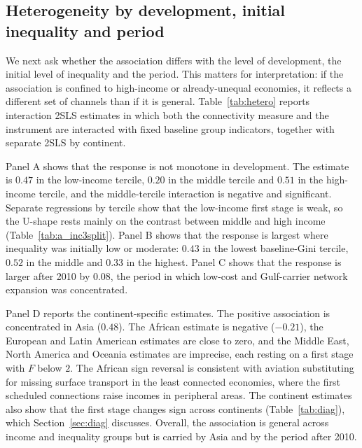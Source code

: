 \subsection{Heterogeneity by development, initial inequality and period}
\label{sec:hetero}
We next ask whether the association differs with the level of development, the initial level of inequality and the period. This matters for interpretation: if the association is confined to high-income or already-unequal economies, it reflects a different set of channels than if it is general. Table~\ref{tab:hetero} reports interaction 2SLS estimates in which both the connectivity measure and the instrument are interacted with fixed baseline group indicators, together with separate 2SLS by continent.

Panel A shows that the response is not monotone in development. The estimate is $0.47$ in the low-income tercile, $0.20$ in the middle tercile and $0.51$ in the high-income tercile, and the middle-tercile interaction is negative and significant. Separate regressions by tercile show that the low-income first stage is weak, so the U-shape rests mainly on the contrast between middle and high income (Table~\ref{tab:a_inc3split}). Panel B shows that the response is largest where inequality was initially low or moderate: $0.43$ in the lowest baseline-Gini tercile, $0.52$ in the middle and $0.33$ in the highest. Panel C shows that the response is larger after 2010 by $0.08$, the period in which low-cost and Gulf-carrier network expansion was concentrated.

Panel D reports the continent-specific estimates. The positive association is concentrated in Asia ($0.48$). The African estimate is negative ($-0.21$), the European and Latin American estimates are close to zero, and the Middle East, North America and Oceania estimates are imprecise, each resting on a first stage with $F$ below $2$. The African sign reversal is consistent with aviation substituting for missing surface transport in the least connected economies, where the first scheduled connections raise incomes in peripheral areas. The continent estimates also show that the first stage changes sign across continents (Table~\ref{tab:diag}), which Section~\ref{sec:diag} discusses. Overall, the association is general across income and inequality groups but is carried by Asia and by the period after 2010.

